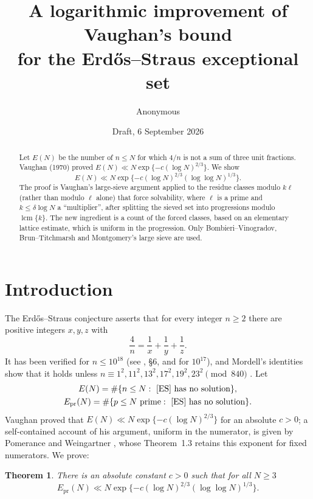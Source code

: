 \documentclass[11pt,reqno]{amsart}
\title[A loglog improvement of Vaughan's bound]{A logarithmic improvement of Vaughan's bound\\ for the Erd\H{o}s--Straus exceptional set}
\author{Anonymous}
\date{Draft, 6 September 2026}
\newtheorem{theorem}{Theorem}[section]
\newcommand{\lcm}{\operatorname{lcm}}
\begin{document}
\begin{abstract}
Let $E(N)$ be the number of $n\le N$ for which $4/n$ is not a sum of three unit
fractions.  Vaughan (1970) proved $E(N)\ll N\exp\{-c(\log N)^{2/3}\}$.  We
show
\[
 E(N)\ll N\exp\{-c(\log N)^{2/3}(\log\log N)^{1/3}\}.
\]
The proof is Vaughan's large-sieve argument applied to the residue classes
modulo $k\ell$ (rather than modulo $\ell$ alone) that force solvability,
where $\ell$ is a prime and $k\le \delta\log N$ a ``multiplier'', after
splitting the sieved set into progressions modulo $\lcm\{k\}$.  The new
ingredient is a count of the forced classes, based on an elementary lattice
estimate, which is uniform in the progression.  Only Bombieri--Vinogradov,
Brun--Titchmarsh and Montgomery's large sieve are used.
\end{abstract}

\maketitle

\section{Introduction}

The Erd\H{o}s--Straus conjecture asserts that for every integer $n\ge2$ there
are positive integers $x,y,z$ with
\begin{equation}\label{ES}
 \frac4n=\frac1x+\frac1y+\frac1z .
\end{equation}
It has been verified for $n\le10^{18}$ (see \cite{PW}, \S6, and \cite{Salez}
for $10^{17}$), and Mordell's identities show that it holds unless
$n\equiv 1^2,11^2,13^2,17^2,19^2,23^2\pmod{840}$ \cite{Mordell}.  Let
\begin{gather*}
 E(N)=\#\{n\le N:\ \eqref{ES}\ \text{has no solution}\},\\
 E_{\mathrm{pr}}(N)=\#\{p\le N\ \text{prime}:\ \eqref{ES}\ \text{has no solution}\}.
\end{gather*}
Vaughan \cite{Vaughan} proved that $E(N)\ll N\exp\{-c(\log N)^{2/3}\}$ for
an absolute $c>0$; a self-contained account of his argument, uniform in the
numerator, is given by Pomerance and Weingartner \cite{PW}, whose
Theorem~1.3 retains this exponent for fixed numerators.  We prove:

\begin{theorem}\label{thm:main}
There is an absolute constant $c>0$ such that for all $N\ge3$
\[
 E_{\mathrm{pr}}(N)\ll N\exp\{-c(\log N)^{2/3}(\log\log N)^{1/3}\}.
\]
\end{theorem}
\end{document}
